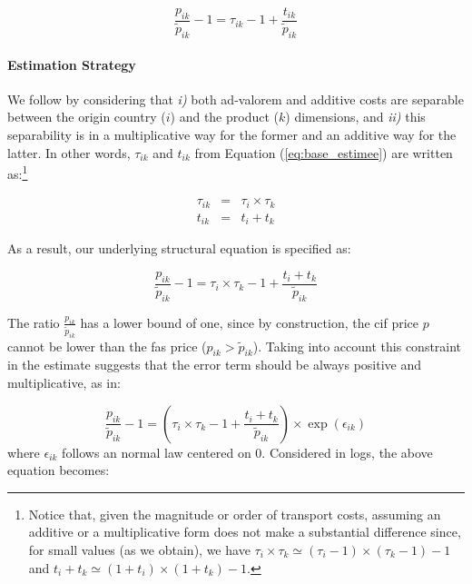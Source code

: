 \documentclass[a4paper,11pt]{article}
\begin{document}
\begin{equation}
\frac{p_{ik}}{\widetilde{p}_{ik}} -1 = \tau_{ik} -1 +\frac{t_{ik}}{ \widetilde{p}_{ik}} \label{eq:base_estimee}
\end{equation}

\paragraph{Estimation Strategy} We follow \citet{Irrazabal_2015} by considering that \textit{i)} both ad-valorem and additive costs are separable between the origin country ($i$) and the product ($k$) dimensions, and \textit{ii)} this separability is in a multiplicative way for the former and an additive way for the latter. In other words, $\tau_{ik}$ and $t_{ik}$ from Equation (\ref{eq:base_estimee}) are written as:\footnote{Notice that, given the magnitude or order of transport costs, assuming an additive or a multiplicative form does not make a substantial difference since, for small values (as we obtain), we have $\tau_i\times \tau_k \simeq (\tau_i-1)\times (\tau_k -1)-1$ and $t_i+t_k\simeq (1+t_i)\times(1+t_k)-1$.}

\begin{eqnarray}
\tau_{ik} &=& \tau_{i} \times \tau_{k} \label{eq:ad-valorem}\\
t_{ik} &=& t_{i} + t_{k} \label{eq:add}
\end{eqnarray}

\noindent As a result, our underlying structural equation is specified as:

\begin{equation*}
\frac{p_{ik}}{\widetilde{p}_{ik}}-1 =\tau_{i} \times \tau_{k} -1 +\frac{t_{i} + t_{k}}{ \widetilde{p}_{ik}} \label{eq:theory_equation}
\end{equation*}

The ratio $\frac{p_{ik}}{\widetilde{p}_{ik}}$ has a lower bound of one, since by construction, the cif price $p$ cannot be lower than the fas price ($p_{ik}>\widetilde{p}_{ik}$). Taking into account this constraint in the estimate suggests that the error term should be always positive and multiplicative, as in:

\begin{equation*}
\frac{p_{ik}}{\widetilde{p}_{ik}}-1 =\left(\tau_{i} \times \tau_{k} -1+\frac{t_{i} + t_{k}}{\widetilde{p}_{ik}} \right)\times \exp(\epsilon_{ik})
\end{equation*}
\noindent where $\epsilon_{ik}$ follows an normal law centered on 0. Considered in logs, the above equation becomes:
\end{document}
